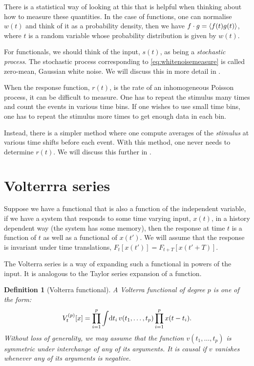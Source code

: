 \documentclass[12pt]{article}
\theoremstyle{slplain}
\theoremstyle{sldefinition}
\newtheorem{defn}{Definition}
\theoremstyle{remark}
\begin{document}
There is a statistical way of looking at this that is helpful when thinking about how to measure these quantities. In the case of functions, one can normalise $w(t)$ and think of it as a probability density, then we have $f \cdot g = \left\langle f(t)g(t) \right\rangle$, where $t$ is a random variable whose probability distribution is given by $w(t)$.

For functionals, we should think of the input, $s(t)$, as being a \emph{stochastic process}. The stochastic process corresponding to \eqref{eq:whitenoisemeasure} is called zero-mean, Gaussian white noise. We will discuss this in more detail in .

When the response function, $r(t)$, is the rate of an inhomogeneous Poisson process, it can be difficult to measure. One has to repeat the stimulus many times and count the events in various time bins. If one wishes to use small time bins, one has to repeat the stimulus more times to get enough data in each bin.

Instead, there is a simpler method where one compute averages of the \emph{stimulus} at various time shifts before each event. With this method, one never needs to determine $r(t)$. We will discuss this further in .


\section{Volterrra series}\label{sec:volterra}

Suppose we have a functional that is also a function of the independent variable, \eg if we have a system that responds to some time varying input, $x(t)$, in a history dependent way (\ie the system has some memory), then the response at time $t$ is a function of $t$ as well as a functional of $x(t')$. We will assume that the response is invariant under time translations, \ie $F_t[x(t')]=F_{t+T}[x(t'+T)]$.

The Volterra series is a way of expanding such a functional in powers of the input. It is analogous to the Taylor series expansion of a function.

\begin{defn}[Volterra functional]
  A Volterra functional of degree $p$ is one of the form:
  \begin{equation}\label{eq:volfunc}
    V^{(p)}_t[x] = \prod_{i=1}^p \int\!\mathrm{d} t_i\,  v(t_1,\ldots,t_p) \prod_{i=1}^p x(t-t_i).
  \end{equation}
  Without loss of generality, we may assume that the function $v(t_1,\ldots,t_p)$ is symmetric under interchange of any of its arguments. It is causal if $v$ vanishes whenever any of its arguments is negative.
\end{defn}
\end{document}
